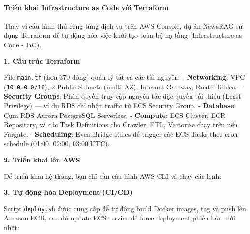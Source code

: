 \hypertarget{triux1ec3n-khai-infrastructure-as-code-vux1edbi-terraform}{%
\paragraph{Triển khai Infrastructure as Code với
Terraform}}

Thay vì cấu hình thủ công từng dịch vụ trên AWS Console, dự án NewsRAG
sử dụng Terraform để tự động hóa việc khởi tạo toàn bộ hạ tầng
(Infrastructure as Code - IaC).

\textbf{1. Cấu trúc Terraform}

File \texttt{main.tf} (hơn 370 dòng) quản lý tất cả các tài nguyên: -
\textbf{Networking}: VPC (\texttt{10.0.0.0/16}), 2 Public Subnets
(multi-AZ), Internet Gateway, Route Tables. - \textbf{Security Groups}:
Phân quyền truy cập nguyên tắc đặc quyền tối thiểu (Least Privilege) ---
ví dụ RDS chỉ nhận traffic từ ECS Security Group. - \textbf{Database}:
Cụm RDS Aurora PostgreSQL Serverless. - \textbf{Compute}: ECS Cluster,
ECR Repository, và các Task Definitions cho Crawler, ETL, Vectorize chạy
trên nền Fargate. - \textbf{Scheduling}: EventBridge Rules để trigger
các ECS Tasks theo cron schedule (01:00, 02:00, 03:00 UTC).

\textbf{2. Triển khai lên AWS}

Để triển khai hệ thống, bạn chỉ cần cấu hình AWS CLI và chạy các lệnh:

\begin{Shaded}
\begin{Highlighting}[]


\end{Highlighting}
\end{Shaded}

\textbf{3. Tự động hóa Deployment (CI/CD)}

Script \texttt{deploy.sh} được cung cấp để tự động build Docker images,
tag và push lên Amazon ECR, sau đó update ECS service để force
deployment phiên bản mới nhất:

